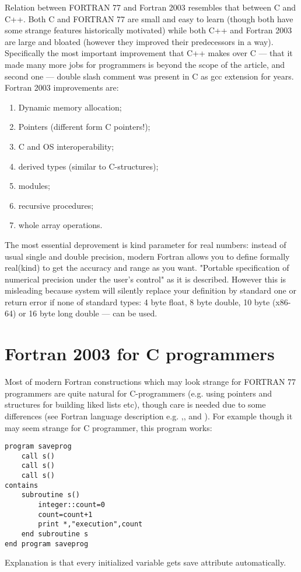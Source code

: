 \documentclass[a4paper]{article}
\begin{document}
Relation between FORTRAN 77 and Fortran 2003 resembles that between C and C++. Both C and FORTRAN 77 are small and easy to learn (though both have some strange features historically motivated) while both C++ and Fortran 2003 are large and bloated (however they improved their predecessors in a way). Specifically the most important improvement that C++ makes over C --- that it made many more jobs for programmers is beyond the scope of the article, and second one --- double slash comment was present in C as gcc extension for years. Fortran 2003 improvements are:
\begin{enumerate}
\item Dynamic memory allocation;
\item Pointers (different form C pointers!);
\item C and OS interoperability;
\item derived types (similar to C-structures);
\item modules;
\item recursive procedures;
\item whole array operations.
\end{enumerate}
 The most essential deprovement  is kind parameter for real numbers: instead of usual single and double precision, modern Fortran allows you to define formally real(kind) to get the accuracy and range as you want. "Portable specification of numerical precision under the user's control" as it is described. However  this is misleading because system will silently replace your definition by standard one or return error if none of standard types: 4 byte float, 8 byte double,  10 byte  (x86-64) or 16 byte long double --- can be used. 
\section{Fortran 2003 for C programmers}
Most of modern Fortran constructions  which may look strange for FORTRAN 77 programmers are quite natural for C-programmers (e.g. using pointers and structures for building liked lists etc), though care is needed due to some differences (see Fortran language description e.g. \cite {chapman},\cite {f2003-handbook}, \cite {f2003-guide} and \cite {f2003-intro}). For example though it may seem strange for C programmer, this program works:
\begin{verbatim}
program saveprog
    call s()
    call s()
    call s()
contains
    subroutine s()
        integer::count=0
        count=count+1
        print *,"execution",count
    end subroutine s
end program saveprog    
\end{verbatim}
Explanation is that every initialized variable gets save attribute automatically.
\end{document}
